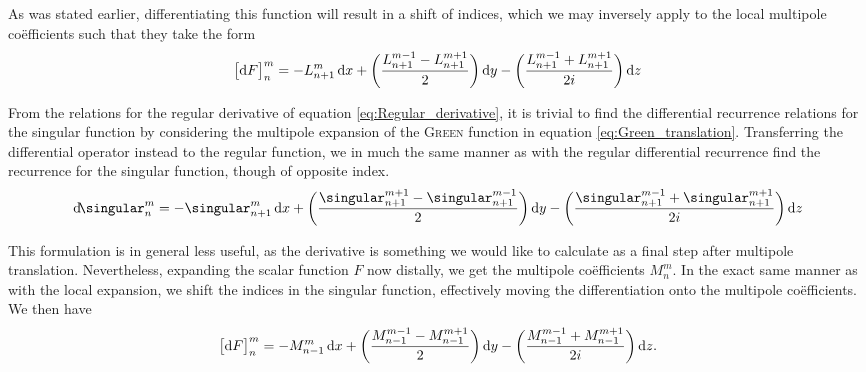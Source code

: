 \noindent
As was stated earlier, differentiating this function will result in a shift of indices, which we may inversely apply to the local multipole coëfficients such that they take the form
%
\begin{equation}
  {\big[ \mathrm{d}F \big]}_n^m = -L_{n+1}^m \,\mathrm{d} x
  + \bigg( \frac{L_{n+1}^{m-1} - L_{n+1}^{m+1}}{2} \bigg) \,\mathrm{d} y
  - \bigg( \frac{L_{n+1}^{m-1} + L_{n+1}^{m+1}}{2i} \bigg) \,\mathrm{d} z
\end{equation}

\noindent
From the relations for the regular derivative of equation \eqref{eq:Regular_derivative}, it is trivial to find the differential recurrence relations for the singular function by considering the multipole expansion of the \textsc{Green} function in equation \eqref{eq:Green_translation}.
Transferring the differential operator instead to the regular function, we in much the same manner as with the regular differential recurrence find the recurrence for the singular function, though of opposite index.
%
\begin{equation}\label{eq:Singular_derivative}
  \dee\!\singular_n^m = -\singular_{n+1}^{m} \,\dee x
  + \bigg( \frac{\singular_{n+1}^{m+1} - \singular_{n+1}^{m-1}}{2} \bigg) \,\dee y
  - \bigg( \frac{\singular_{n+1}^{m-1} + \singular_{n+1}^{m+1}}{2i} \bigg) \,\dee z
\end{equation}

\noindent
This formulation is in general less useful, as the derivative is something we would like to calculate as a final step after multipole translation.
Nevertheless, expanding the scalar function $F$ now distally, we get the multipole coëfficients $M_n^m$.
In the exact same manner as with the local expansion, we shift the indices in the singular function, effectively moving the differentiation onto the multipole coëfficients.
We then have
%
\begin{equation}
  {\big[ \mathrm{d}F \big]}_n^m = -M_{n-1}^m \,\mathrm{d} x
  + \bigg( \frac{M_{n-1}^{m-1} - M_{n-1}^{m+1}}{2} \bigg) \,\mathrm{d} y
  - \bigg( \frac{M_{n-1}^{m-1} + M_{n-1}^{m+1}}{2i} \bigg) \,\mathrm{d} z.
\end{equation}

